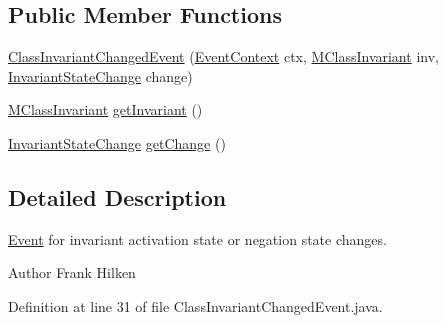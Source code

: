 \subsection*{Public Member Functions}
\begin{DoxyCompactItemize}
\item 
\hyperlink{classorg_1_1tzi_1_1use_1_1uml_1_1sys_1_1events_1_1_class_invariant_changed_event_af655db59a9c3f6c33f077d3148c600a9}{Class\-Invariant\-Changed\-Event} (\hyperlink{enumorg_1_1tzi_1_1use_1_1uml_1_1sys_1_1events_1_1tags_1_1_event_context}{Event\-Context} ctx, \hyperlink{classorg_1_1tzi_1_1use_1_1uml_1_1mm_1_1_m_class_invariant}{M\-Class\-Invariant} inv, \hyperlink{enumorg_1_1tzi_1_1use_1_1uml_1_1sys_1_1events_1_1_class_invariant_changed_event_1_1_invariant_state_change}{Invariant\-State\-Change} change)
\item 
\hyperlink{classorg_1_1tzi_1_1use_1_1uml_1_1mm_1_1_m_class_invariant}{M\-Class\-Invariant} \hyperlink{classorg_1_1tzi_1_1use_1_1uml_1_1sys_1_1events_1_1_class_invariant_changed_event_a21c1f6ba9bae7ba3911c48e97e15cb4c}{get\-Invariant} ()
\item 
\hyperlink{enumorg_1_1tzi_1_1use_1_1uml_1_1sys_1_1events_1_1_class_invariant_changed_event_1_1_invariant_state_change}{Invariant\-State\-Change} \hyperlink{classorg_1_1tzi_1_1use_1_1uml_1_1sys_1_1events_1_1_class_invariant_changed_event_af9994e55f89a873b905cfbd08b2af2e5}{get\-Change} ()
\end{DoxyCompactItemize}


\subsection{Detailed Description}
\hyperlink{classorg_1_1tzi_1_1use_1_1uml_1_1sys_1_1events_1_1_event}{Event} for invariant activation state or negation state changes.

\begin{DoxyAuthor}{Author}
Frank Hilken 
\end{DoxyAuthor}


Definition at line 31 of file Class\-Invariant\-Changed\-Event.\-java.



